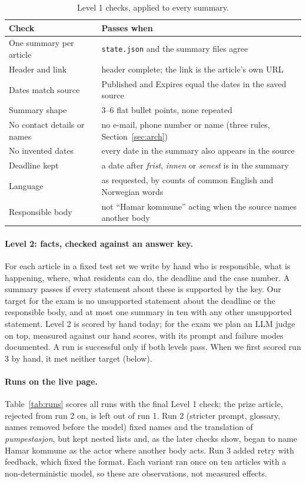 \documentclass{article}
\begin{document}
\begin{table}[h]
  \caption{Level 1 checks, applied to every summary.}
  \label{tab:checks}
  \centering\footnotesize
  \begin{tabular}{@{}lL{9.7cm}@{}}
    \toprule
    Check & Passes when \\
    \midrule
    One summary per article & \texttt{state.json} and the summary files agree \\
    Header and link & header complete; the link is the article's own URL \\
    Dates match source & Published and Expires equal the dates in the saved source \\
    Summary shape & 3--6 flat bullet points, none repeated \\
    No contact details or names & no e-mail, phone number or name (three rules, Section~\ref{sec:arch}) \\
    No invented dates & every date in the summary also appears in the source \\
    Deadline kept & a date after \emph{frist}, \emph{innen} or \emph{senest} is in the summary \\
    Language & as requested, by counts of common English and Norwegian words \\
    Responsible body & not ``Hamar kommune'' acting when the source names another body \\
    \bottomrule
  \end{tabular}
\end{table}

\paragraph{Level 2: facts, checked against an answer key.} For each article in a fixed test set we write by hand
who is responsible, what is happening, where, what residents can do, the deadline and the case
number. A summary passes if every statement about these is supported by the key. Our target for the exam is no unsupported statement about the
deadline or the responsible body, and at most one summary in ten with any other unsupported
statement. Level 2 is scored by hand today; for the exam we plan an LLM judge on top,
measured against our hand scores, with its prompt and failure modes documented. A run is successful
only if both levels pass. When we first scored run 3 by hand, it met neither target (below).

\paragraph{Runs on the live page.} Table~\ref{tab:runs} scores all runs with the final Level 1 check;
the prize article, rejected from run 2 on, is left out of run 1. Run 2 (stricter prompt, glossary,
names removed before the model) fixed names and the translation of \emph{pumpestasjon}, but kept
nested lists and, as the later checks show, began to name Hamar kommune as the actor where another
body acts. Run 3 added retry with feedback, which fixed the format. Each variant ran once on ten
articles with a non-deterministic model, so these are observations, not measured effects.
\end{document}
